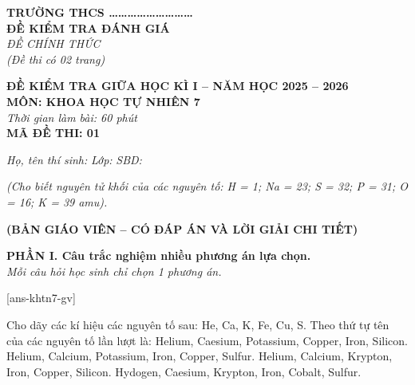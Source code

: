 \documentclass[11pt,a4paper]{article}
\begin{document}
\begin{minipage}[t]{0.45\textwidth}
\textbf{TRƯỜNG THCS \dots\dots\dots\dots\dots\dots\dots\dots\dots}\\
\textbf{ĐỀ KIỂM TRA ĐÁNH GIÁ}\\
\textit{ĐỀ CHÍNH THỨC}\\
\textit{(Đề thi có 02 trang)}
\end{minipage}
\hfill
\begin{minipage}[t]{0.52\textwidth}
\raggedleft
\textbf{\color{hfRed}ĐỀ KIỂM TRA GIỮA HỌC KÌ I -- NĂM HỌC 2025 -- 2026}\\
\textbf{MÔN: KHOA HỌC TỰ NHIÊN 7}\\
\textit{Thời gian làm bài: 60 phút}\\
\textbf{MÃ ĐỀ THI: 01}
\end{minipage}

\vspace{3pt}
\noindent
\textit{Họ, tên thí sinh:} \dotfill \textit{Lớp:} \dotfill \textit{SBD:} \dotfill

\vspace{2pt}
\noindent
\textit{\footnotesize (Cho biết nguyên tử khối của các nguyên tố: H = 1; Na = 23; S = 32; P = 31; O = 16; K = 39 amu).}


\vspace{2pt}
\begin{center}
\textbf{\color{hfRed}\large (BẢN GIÁO VIÊN -- CÓ ĐÁP ÁN VÀ LỜI GIẢI CHI TIẾT)}
\end{center}


\vspace{3pt}
\noindent
\textbf{\color{mainGreen}PHẦN I. Câu trắc nghiệm nhiều phương án lựa chọn.}\\
\textit{Mỗi câu hỏi học sinh chỉ chọn 1 phương án.}

[ans-khtn7-gv]

\begin{ex}
Cho dãy các kí hiệu các nguyên tố sau: He, Ca, K, Fe, Cu, S. Theo thứ tự tên của các nguyên tố lần lượt là:
\choice
{Helium, Caesium, Potassium, Copper, Iron, Silicon.}
{\True Helium, Calcium, Potassium, Iron, Copper, Sulfur.}
{Helium, Calcium, Krypton, Iron, Copper, Silicon.}
{Hydogen, Caesium, Krypton, Iron, Cobalt, Sulfur.}
\end{ex}
\end{document}
